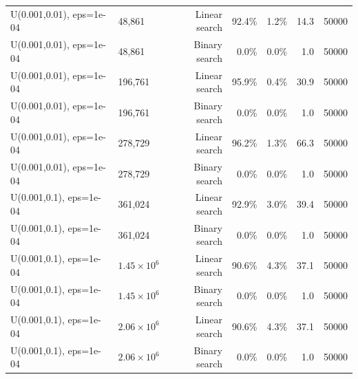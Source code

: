 \begin{tabular}{llrrrrr}
U(0.001,0.01), eps=1e-04 & 48,861 & Linear search & 92.4\% & 1.2\% & 14.3 & 50000 \\
U(0.001,0.01), eps=1e-04 & 48,861 & Binary search & 0.0\% & 0.0\% & 1.0 & 50000 \\
U(0.001,0.01), eps=1e-04 & 196,761 & Linear search & 95.9\% & 0.4\% & 30.9 & 50000 \\
U(0.001,0.01), eps=1e-04 & 196,761 & Binary search & 0.0\% & 0.0\% & 1.0 & 50000 \\
U(0.001,0.01), eps=1e-04 & 278,729 & Linear search & 96.2\% & 1.3\% & 66.3 & 50000 \\
U(0.001,0.01), eps=1e-04 & 278,729 & Binary search & 0.0\% & 0.0\% & 1.0 & 50000 \\
U(0.001,0.1), eps=1e-04 & 361,024 & Linear search & 92.9\% & 3.0\% & 39.4 & 50000 \\
U(0.001,0.1), eps=1e-04 & 361,024 & Binary search & 0.0\% & 0.0\% & 1.0 & 50000 \\
U(0.001,0.1), eps=1e-04 & $1.45\times 10^{6}$ & Linear search & 90.6\% & 4.3\% & 37.1 & 50000 \\
U(0.001,0.1), eps=1e-04 & $1.45\times 10^{6}$ & Binary search & 0.0\% & 0.0\% & 1.0 & 50000 \\
U(0.001,0.1), eps=1e-04 & $2.06\times 10^{6}$ & Linear search & 90.6\% & 4.3\% & 37.1 & 50000 \\
U(0.001,0.1), eps=1e-04 & $2.06\times 10^{6}$ & Binary search & 0.0\% & 0.0\% & 1.0 & 50000 \\
\bottomrule
\end{tabular}
